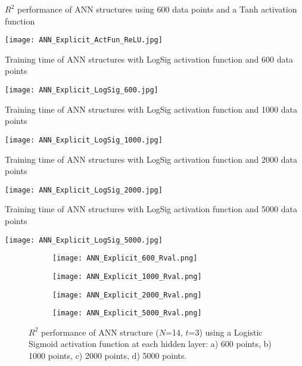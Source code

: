 \begin{table}
	\caption{$R^2$ performance of ANN structures using 600 data points and a Tanh activation function}
	\label{ReLU_table}
	\texttt{[image: ANN\_Explicit\_ActFun\_ReLU.jpg]}
\end{table}

\begin{table}
	\caption{Training time of ANN structures with LogSig activation function and 600 data points}
	\label{ANN_Explicit_LogSig_600_table}
	\texttt{[image: ANN\_Explicit\_LogSig\_600.jpg]}
\end{table}

\begin{table}
	\caption{Training time of ANN structures with LogSig activation function and 1000 data points}
	\label{ANN_Explicit_LogSig_1000_table}
	\texttt{[image: ANN\_Explicit\_LogSig\_1000.jpg]}
\end{table}

\begin{table}
	\caption{Training time of ANN structures with LogSig activation function and 2000 data points}
	\label{ANN_Explicit_LogSig_2000_table}
	\texttt{[image: ANN\_Explicit\_LogSig\_2000.jpg]}
\end{table}

\begin{table}
	\caption{Training time of ANN structures with LogSig activation function and 5000 data points}
	\label{ANN_Explicit_LogSig_5000_table}
	\texttt{[image: ANN\_Explicit\_LogSig\_5000.jpg]}
\end{table}

\begin{figure}
	\centering
	\begin{subfigure}[b]{0.49\textwidth}
		\centering
		\texttt{[image: ANN\_Explicit\_600\_Rval.png]}
		\caption{}
		\label{600_Rval}
	\end{subfigure}
	\hfill
	\begin{subfigure}[b]{0.49\textwidth}
		\centering
		\texttt{[image: ANN\_Explicit\_1000\_Rval.png]}
		\caption{}
		\label{1000_Rval}
	\end{subfigure}
	\hfill
	\begin{subfigure}[b]{0.49\textwidth}
		\centering
		\texttt{[image: ANN\_Explicit\_2000\_Rval.png]}
		\caption{}
		\label{2000_Rval}
	\end{subfigure}
	\hfill
	\begin{subfigure}[b]{0.49\textwidth}
		\centering
		\texttt{[image: ANN\_Explicit\_5000\_Rval.png]}
		\caption{}
		\label{5000_Rval}
	\end{subfigure}
	\caption{$R^2$ performance of ANN structure ($N$=14, $t$=3) using a Logistic Sigmoid activation function at each hidden layer: a) 600 points, b) 1000 points, c) 2000 points, d) 5000 points.}
	\label{$R^2$ performance of ANN structure}
\end{figure}


